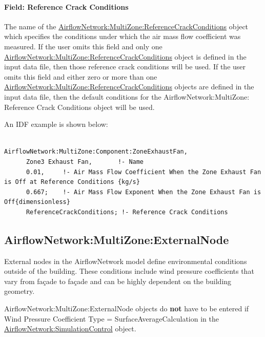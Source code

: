 \paragraph{Field: Reference Crack Conditions}\label{field-reference-crack-conditions-1}

The name of the \hyperref[airflownetworkmultizonereferencecrackconditions]{AirflowNetwork:MultiZone:ReferenceCrackConditions} object which specifies the conditions under which the air mass flow coefficient was measured. If the user omits this field and only one \hyperref[airflownetworkmultizonereferencecrackconditions]{AirflowNetwork:MultiZone:ReferenceCrackConditions} object is defined in the input data file, then those reference crack conditions will be used. If the user omits this field and either zero or more than one \hyperref[airflownetworkmultizonereferencecrackconditions]{AirflowNetwork:MultiZone:ReferenceCrackConditions} objects are defined in the input data file, then the default conditions for the AirflowNetwork:MultiZone: Reference Crack Conditions object will be used.

An IDF example is shown below:

\begin{lstlisting}

AirflowNetwork:MultiZone:Component:ZoneExhaustFan,
      Zone3 Exhaust Fan,       !- Name
      0.01,     !- Air Mass Flow Coefficient When the Zone Exhaust Fan is Off at Reference Conditions {kg/s}
      0.667;    !- Air Mass Flow Exponent When the Zone Exhaust Fan is Off{dimensionless}
      ReferenceCrackConditions; !- Reference Crack Conditions
\end{lstlisting}

\subsection{AirflowNetwork:MultiZone:ExternalNode}\label{airflownetworkmultizoneexternalnode}

External nodes in the AirflowNetwork model define environmental conditions
outside of the building. These conditions include wind pressure coefficients
that vary from fa\c{c}ade to fa\c{c}ade and can be highly dependent on the
building geometry.

AirflowNetwork:MultiZone:ExternalNode objects do \textbf{not} have to be
entered if Wind Pressure Coefficient Type = SurfaceAverageCalculation in the
\hyperref[airflownetworksimulationcontrol]{AirflowNetwork:\hyperref[simulationcontrol]{SimulationControl}} object.


